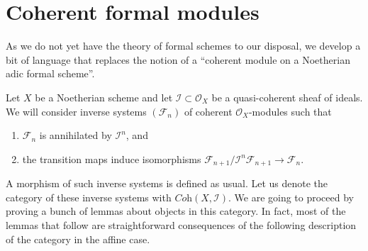 \section{Coherent formal modules}
\label{section-coherent-formal}

\noindent
As we do not yet have the theory of formal schemes to our disposal, we
develop a bit of language that replaces the notion of a ``coherent module on a
Noetherian adic formal scheme''.

\medskip\noindent
Let $X$ be a Noetherian scheme and let $\mathcal{I} \subset \mathcal{O}_X$
be a quasi-coherent sheaf of ideals. We will consider inverse
systems $(\mathcal{F}_n)$ of coherent $\mathcal{O}_X$-modules such that
\begin{enumerate}
\item $\mathcal{F}_n$ is annihilated by $\mathcal{I}^n$, and
\item the transition maps induce isomorphisms
$\mathcal{F}_{n + 1}/\mathcal{I}^n\mathcal{F}_{n + 1} \to \mathcal{F}_n$.
\end{enumerate}
A morphism of such inverse systems is defined as usual.
Let us denote the category of these inverse systems with
$\textit{Coh}(X, \mathcal{I})$. We are going to proceed by proving
a bunch of lemmas about objects in this category. In fact, most
of the lemmas that follow are straightforward consequences of the following
description of the category in the affine case.

